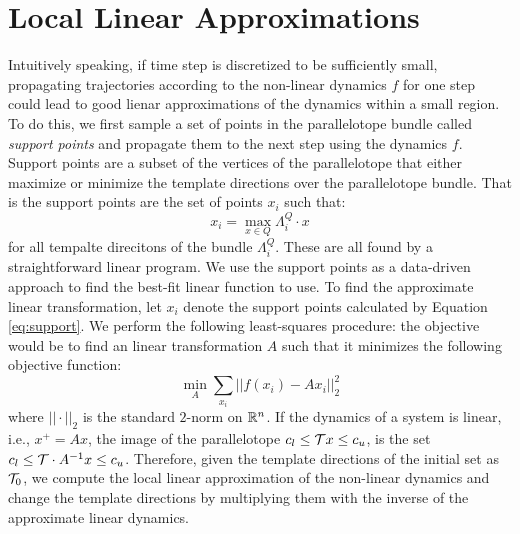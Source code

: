 \section{Local Linear Approximations}
\label{sec:lin_app}
%
Intuitively speaking, if time step is discretized to be sufficiently small, propagating trajectories according to the non-linear dynamics $f$ for one step could lead to good lienar approximations of the dynamics within a small region.
%
%
To do this, we first sample a set of points in the parallelotope bundle called \emph{support points} and propagate them to the next step using the dynamics $f$.
%
Support points are a subset of the vertices of the parallelotope that either maximize or minimize the template directions over the parallelotope bundle.
%
That is the support points are the set of points $x_i$ such that:
\begin{equation}
\label{eq:support}
x_i = \max_{x \in Q} \Lambda^Q_i\cdot x
\end{equation}
%
for all tempalte direcitons of the bundle $\Lambda^Q_i$. These are all found by a straightforward linear program.
%
%
We use the support points as a data-driven approach to find the best-fit linear function to use.
%
To find the approximate linear transformation, let $x_i$ denote the support points calculated by Equation \ref{eq:support}. We perform the following least-squares procedure: the objective would be to find an linear transformation $A$ such that it minimizes the following objective function:
\begin{equation}
  \label{eq:least_squares}
  \min_{A} \sum_{x_i} ||f(x_i) - Ax_i||^2_2
\end{equation}
%
where $||\cdot||_2$ is the standard $2$-norm on ${\mathbb{R}}^n$.
%
If the dynamics of a system is linear, i.e., $x^{+} = Ax$, the image of the parallelotope $c_{l} \leq \mathcal{T} x \leq c_{u}$, is the set $c_{l} \leq \mathcal{T} \cdot A^{-1} x \leq c_{u}$.
%
Therefore, given the template directions of the initial set as $\mathcal{T}_0$, we compute the local linear approximation of the non-linear dynamics and change the template directions by multiplying them with the inverse of the approximate linear dynamics.
%


